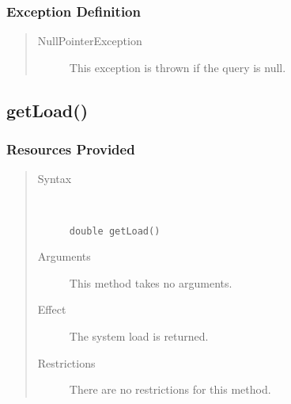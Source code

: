 \subsubsection{Exception Definition}

\begin{quote}
	\begin{description}
		\item[NullPointerException] This exception is thrown if the query is null.
	\end{description} 
\end{quote}

\subsection{getLoad()}

\subsubsection{Resources Provided}

\begin{quote}
	\begin{description}
		\item[Syntax] \ 
		\begin{verbatim}
double getLoad() 
		\end{verbatim}
		\item[Arguments] This method takes no arguments.
		\item[Effect] The system load is returned. 
		\item[Restrictions] There are no restrictions for this method.
	\end{description} 
\end{quote}